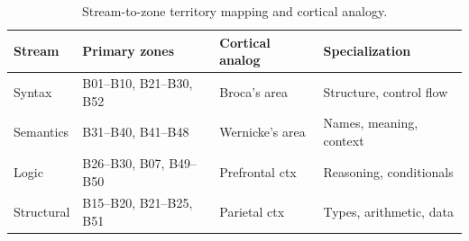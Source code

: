 \documentclass[11pt,a4paper]{article}
\begin{document}
\begin{table}[h]
\centering
\small
\begin{tabular}{llll}
\toprule
\textbf{Stream} & \textbf{Primary zones} & \textbf{Cortical analog} & \textbf{Specialization} \\
\midrule
Syntax     & B01--B10, B21--B30, B52 & Broca's area    & Structure, control flow \\
Semantics  & B31--B40, B41--B48      & Wernicke's area & Names, meaning, context \\
Logic      & B26--B30, B07, B49--B50 & Prefrontal ctx  & Reasoning, conditionals \\
Structural & B15--B20, B21--B25, B51 & Parietal ctx    & Types, arithmetic, data \\
\bottomrule
\end{tabular}
\caption{Stream-to-zone territory mapping and cortical analogy.}
\label{tab:streams}
\end{table}
\end{document}
